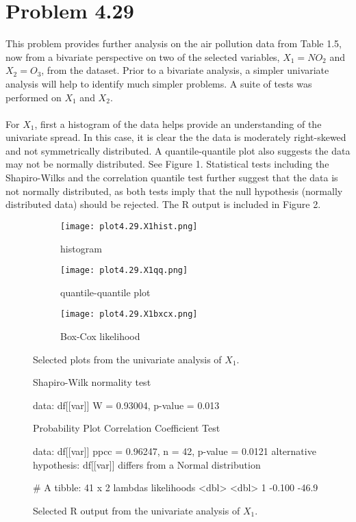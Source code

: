 \section*{Problem 4.29}
This problem provides further analysis on the air pollution data from Table 1.5, now from a bivariate perspective on two of the selected variables, $X_1 = NO_2$ and $X_2 = O_3$, from the dataset. Prior to a bivariate analysis, a simpler univariate analysis will help to identify much simpler problems. A suite of tests was performed on $X_1$ and $X_2$. 
\\
\\For $X_1$, first a histogram of the data helps provide an understanding of the univariate spread. In this case, it is clear the the data is moderately right-skewed and not symmetrically distributed. A quantile-quantile plot also suggests the data may not be normally distributed. See Figure 1. Statistical tests including the Shapiro-Wilks and the correlation quantile test further suggest that the data is not normally distributed, as both tests imply that the null hypothesis (normally distributed data) should be rejected. The R output is included in Figure 2.
\begin{figure}[H]
\begin{subfigure}{.33\textwidth}
  \centering
  \texttt{[image: plot4.29.X1hist.png]}
  \caption{histogram}
  \label{fig:sfig1}
\end{subfigure}%
\begin{subfigure}{.33\textwidth}
  \centering
  \texttt{[image: plot4.29.X1qq.png]}
  \caption{quantile-quantile plot}
  \label{fig:sfig2}
\end{subfigure}
\begin{subfigure}{.33\textwidth}
  \centering
  \texttt{[image: plot4.29.X1bxcx.png]}
  \caption{Box-Cox likelihood}
  \label{fig:sfig3}
\end{subfigure}%
\caption{Selected plots from the univariate analysis of $X_1$.} 
\end{figure}
\begin{figure}[H]
\begin{rc}
	Shapiro-Wilk normality test

data:  df[[var]]
W = 0.93004, p-value = 0.013


	Probability Plot Correlation Coefficient Test

data:  df[[var]]
ppcc = 0.96247, n = 42, p-value = 0.0121
alternative hypothesis: df[[var]] differs from a Normal distribution

# A tibble: 41 x 2
  lambdas likelihoods
    <dbl>       <dbl>
1  -0.100       -46.9
\end{rc}
\caption{Selected R output from the univariate analysis of $X_1$.}
\end{figure}
